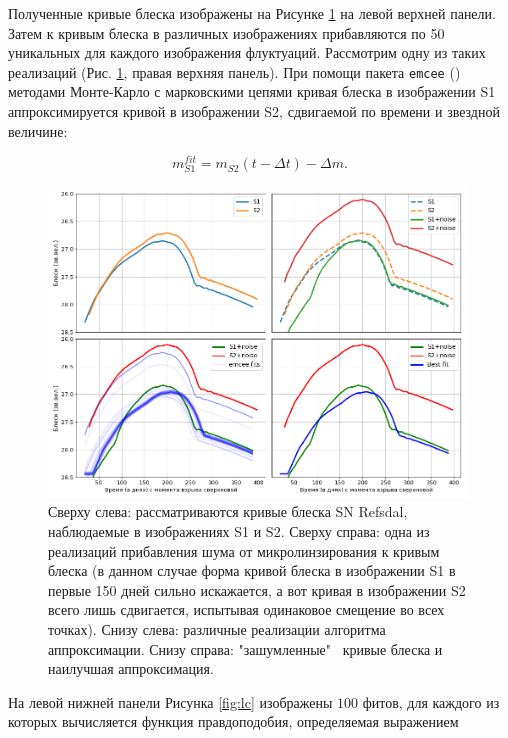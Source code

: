 Полученные кривые блеска изображены на Рисунке \ref{fig:lc} на левой верхней панели. Затем к кривым блеска в различных изображениях прибавляются по 50 уникальных для каждого изображения флуктуаций. Рассмотрим одну из таких реализаций (Рис. \ref{fig:lc}, правая верхняя панель). При помощи пакета \texttt{emcee} (\cite{emcee}) методами Монте-Карло с марковскими цепями кривая блеска в изображении S1 аппроксимируется кривой в изображении S2, сдвигаемой по времени и звездной величине: 

$$ m_{S1}^{fit} = m_{S2}(t - \Delta t)-\Delta m. $$ 

\begin{figure}[H]
    \centering
	\includegraphics[width=0.99\textwidth]{microlensing/images/fitting.png}
	\caption{Сверху слева: рассматриваются кривые блеска SN Refsdal, наблюдаемые в изображениях S1 и S2. Сверху справа: одна из реализаций прибавления шума от микролинзирования к кривым блеска (в данном случае форма кривой блеска в изображении S1 в первые 150 дней сильно искажается, а вот кривая в изображении S2 всего лишь сдвигается, испытывая одинаковое смещение во всех точках). Снизу слева: различные реализации алгоритма аппроксимации. Снизу справа: "зашумленные" \ кривые блеска и наилучшая аппроксимация.  } 
	\label{fig:lc}
\end{figure}

На левой нижней панели Рисунка \eqref{fig:lc} изображены $100$ фитов, для каждого из которых вычисляется функция правдоподобия, определяемая выражением



